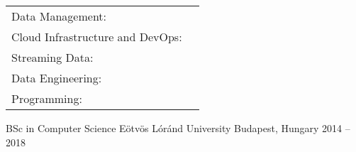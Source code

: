 \documentclass[]{awesome-cv}
\begin{document}
\begin{cventries}
	\cventry
	{}
	{\def\arraystretch{1.15}{\begin{tabular}{ l l }
		Data Management: & {\skill{ Snowflake, BigQuery, Redshift, DuckDB, Databricks, SQL, Data Lakes }} \\
		Cloud Infrastructure and DevOps: & {\skill{ GCP, AWS, Terraform, Docker, Kubernetes, CI/CD, GNU/Linux }} \\
		Streaming Data: & {\skill{ Kafka, Flink, Redpanda, CDC (Debezium), Kinesis, Event-driven architectures }} \\
		Data Engineering: & {\skill{ dbt, Airflow, Prefect, Dagster, Fivetran, Meltano, Spark, ETL/ELT }} \\
		Programming: & {\skill { Python, Go, Java, Shell Scripting }} \\
		\end{tabular}}}
	{}
	{}
	{}
\end{cventries}

\begin{cventries}
	\cventry
	{BSc in Computer Science}
	{Eötvös Lóránd University}
	{Budapest, Hungary}
    {2014 – 2018}
	{}
\end{cventries}
\end{document}
